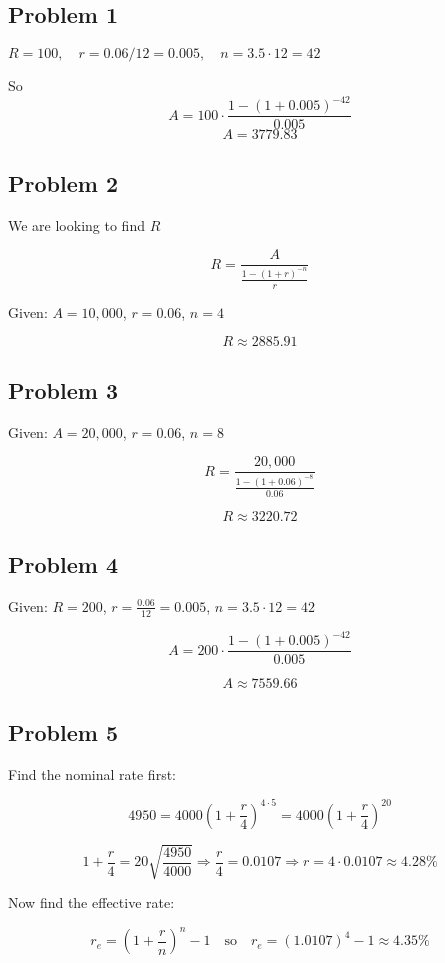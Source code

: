 \documentclass[12pt]{article}
\begin{document}
\subsection*{Problem 1}
\(R = 100,\quad r = 0.06/12 = 0.005,\quad n = 3.5 \cdot 12 = 42\)

So
\[
A = 100 \cdot \frac{1 - (1 + 0.005)^{-42}}{0.005}
\]
\[
A = \boxed{3779.83}
\]
\subsection*{Problem 2}
We are looking to find \( R \)

\[
R = \frac{A}{\frac{1 - (1 + r)^{-n}}{r}}
\]

Given: \( A = 10{,}000 \), \( r = 0.06 \), \( n = 4 \)

\[
R \approx \boxed{2885.91}
\]
\subsection*{Problem 3}
Given: \( A = 20{,}000 \), \( r = 0.06 \), \( n = 8 \)

\[
R = \frac{20{,}000}{\frac{1 - (1 + 0.06)^{-8}}{0.06}}
\]

\[
R \approx \boxed{3220.72}
\]

\subsection*{Problem 4}
Given: \( R = 200 \), \( r = \frac{0.06}{12} = 0.005 \), \( n = 3.5 \cdot 12 = 42 \)

\[
A = 200 \cdot \frac{1 - (1 + 0.005)^{-42}}{0.005}
\]

\[
A \approx  \boxed{7559.66}
\]

\subsection*{Problem 5}
Find the nominal rate first:

\[
4950 = 4000 \left(1 + \frac{r}{4}\right)^{4 \cdot 5} = 4000 \left(1 + \frac{r}{4}\right)^{20}
\]

\[
1 + \frac{r}{4} = 20\sqrt{\frac{4950}{4000}} \Rightarrow \frac{r}{4} = 0.0107 \Rightarrow r = 4 \cdot 0.0107 \approx \boxed{4.28\%}
\]

Now find the effective rate:

\[
r_e = \left(1 + \frac{r}{n} \right)^n - 1 \quad \text{so} \quad r_e = (1.0107)^4 - 1 \approx \boxed{4.35\%}
\]
\end{document}
